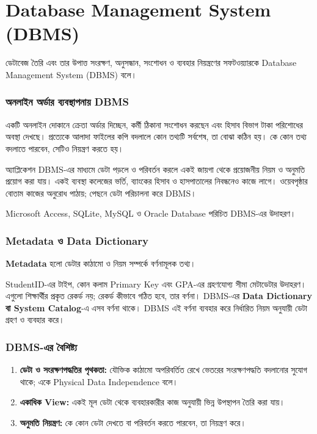 \section{Database Management System (DBMS)}

\begin{definitionbox}{}
ডেটাবেজ তৈরি এবং তার উপাত্ত সংরক্ষণ, অনুসন্ধান, সংশোধন ও ব্যবহার নিয়ন্ত্রণের সফটওয়্যারকে Database Management System (DBMS) বলে।
\end{definitionbox}

\subsubsection{অনলাইন অর্ডার ব্যবস্থাপনায় DBMS}
একটি অনলাইন দোকানে ক্রেতা অর্ডার দিচ্ছেন, কর্মী ঠিকানা সংশোধন করছেন এবং হিসাব বিভাগ টাকা পরিশোধের অবস্থা দেখছে। প্রত্যেকে আলাদা ফাইলের কপি বদলালে কোন তথ্যটি সর্বশেষ, তা বোঝা কঠিন হয়। কে কোন তথ্য বদলাতে পারবেন, সেটিও নিয়ন্ত্রণ করতে হয়।

অ্যাপ্লিকেশন DBMS-এর মাধ্যমে ডেটা পড়লে ও পরিবর্তন করলে একই জায়গা থেকে প্রয়োজনীয় নিয়ম ও অনুমতি প্রয়োগ করা যায়। একই ব্যবস্থা কলেজের ভর্তি, ব্যাংকের হিসাব ও হাসপাতালের নিবন্ধনেও কাজে লাগে। ওয়েবপৃষ্ঠার বোতাম কাজের অনুরোধ পাঠায়; পেছনে ডেটা পরিচালনা করে DBMS।

Microsoft Access, SQLite, MySQL ও Oracle Database পরিচিত DBMS-এর উদাহরণ। 



\subsubsection{Metadata ও Data Dictionary}
\begin{definitionbox}{}
\textbf{Metadata} হলো ডেটার কাঠামো ও নিয়ম সম্পর্কে বর্ণনামূলক তথ্য।
\end{definitionbox}
StudentID-এর টাইপ, কোন কলাম Primary Key এবং GPA-এর গ্রহণযোগ্য সীমা মেটাডেটার উদাহরণ। এগুলো শিক্ষার্থীর প্রকৃত রেকর্ড নয়; রেকর্ড কীভাবে গঠিত হবে, তার বর্ণনা। DBMS-এর \textbf{Data Dictionary বা System Catalog}-এ এসব বর্ণনা থাকে। DBMS এই বর্ণনা ব্যবহার করে নির্ধারিত নিয়ম অনুযায়ী ডেটা গ্রহণ ও ব্যবহার করে।

\subsubsection{DBMS-এর বৈশিষ্ট্য}
\begin{enumerate}
\item \textbf{ডেটা ও সংরক্ষণপদ্ধতির পৃথকতা:} যৌক্তিক কাঠামো অপরিবর্তিত রেখে ভেতরের সংরক্ষণপদ্ধতি বদলানোর সুযোগ থাকে; একে Physical Data Independence বলে।
\item \textbf{একাধিক View:} একই মূল ডেটা থেকে ব্যবহারকারীর কাজ অনুযায়ী ভিন্ন উপস্থাপন তৈরি করা যায়।
\item \textbf{অনুমতি নিয়ন্ত্রণ:} কে কোন ডেটা দেখতে বা পরিবর্তন করতে পারবেন, তা নিয়ন্ত্রণ করে।
\end{enumerate}

